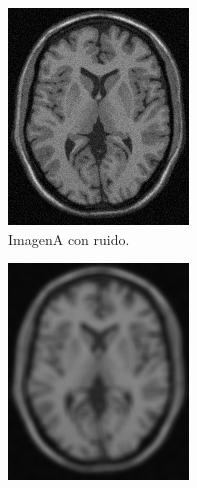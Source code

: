 \documentclass[11pt,twocolumn,twoside]{opticajnl}
\begin{document}
\begin{figure}[h]
\begin{subfigure}[h]{0.32\linewidth}
            \includegraphics[width=\textwidth]{Figuras/ImagenA_noise=5.png}
            \caption{ImagenA con ruido.} 
         \end{subfigure}
         \begin{subfigure}[h]{0.32\linewidth}
            \centering
            \includegraphics[width=\textwidth]{Figuras/ImagenA_noise=5_filter_7x7.png}

\end{subfigure}
\end{figure}
\end{document}
